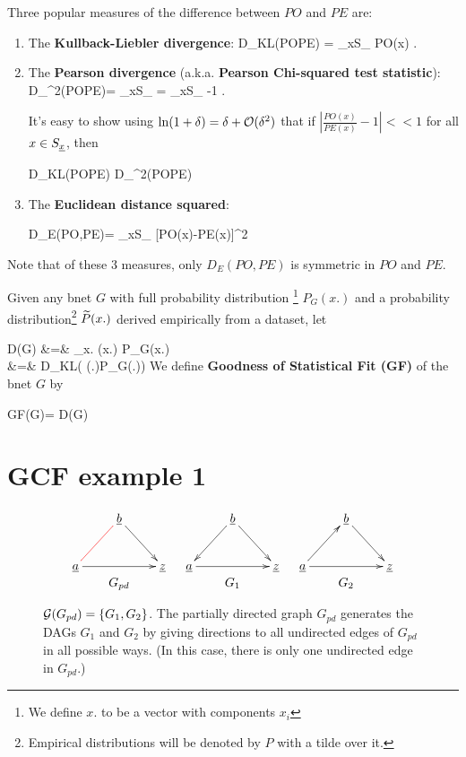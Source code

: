 Three popular
measures of
the difference between $PO$ and $PE$
are:
\begin{enumerate}
\item
The
{\bf Kullback-Liebler divergence}:
\beq
D_{KL}(PO\parallel PE) =
\sum_{x\in S_\rvx}
PO(x)\ln {}
\;.
\eeq
\item
The
{\bf Pearson divergence}
(a.k.a. {\bf Pearson Chi-squared test statistic}):
\beq
D_{\chi^2}(PO\parallel PE)=
\sum_{x\in S_\rvx}
=
\sum_{x\in S_\rvx}
-1
\;.
\eeq

It's easy to show 
using $\ln(1+\delta)=\delta +{\cal O}(\delta^2)$
that
if $\left|\frac{PO(x)}{PE(x)}-1\right|<<1$
for all $x\in S_{\underline{x}}$, then

\beq
D_{KL}(PO\parallel PE)\approx 
D_{\chi^2}(PO\parallel PE)
\eeq

\item
The {\bf Euclidean distance squared}:

\beq
D_E(PO,PE)=
\sum_{x\in S_\rvx}
[PO(x)-PE(x)]^2
\eeq
\end{enumerate}
Note that of these 3 measures,
only $D_E(PO, PE)$ is symmetric 
in $PO$ and $PE$.


Given any bnet $G$
with full probability
distribution
\footnote{We define
$x.$
to be a vector
with components $x_i$}
  $P_G(x.)$
and a
probability distribution\footnote{
Empirical distributions will 
be denoted by $P$ with a tilde over it.}
$\widetilde{P}(x.)$
derived empirically from a dataset,
let

\beqa
D(G)
&=&
\sum_{x.}
(x.)\ln
{}
{P_{G}(x.)}
\\
&=&
D_{KL}(
(\rvx.)\parallel P_{G}(\rvx.))
\eeqa
We define {\bf Goodness of Statistical Fit (GF)}
of the bnet $G$ by

\beq
GF(G)=\ln {}
{D(G)}
\eeq

\section{GCF example 1}

\begin{figure}[h!]
$$
\begin{array}{ccc}
\xymatrix{
&\rvb\ar@[red]@{-}[ld]\ar[dr]
\\
\rva\ar[rr]&&\rvz
}
&
\xymatrix{
&\rvb\ar[dl]\ar[dr]
\\
\rva\ar[rr]&&\rvz
}
&
\xymatrix{
&\rvb\ar[dr]
\\
\rva\ar[ur]\ar[rr]&&\rvz
}
\\
G_{pd}&G_1&G_2
\end{array}
$$
\caption{${\cal G}(G_{pd})=\{G_1, G_2\}$.
The partially directed graph $G_{pd}$
generates the DAGs $G_1$ and $G_2$
by giving directions to
all undirected edges of $G_{pd}$
in
all possible ways.
(In this case, there is only one
undirected edge in $G_{pd}$.) }
\label{fig-ob-eq-1}
\end{figure}

